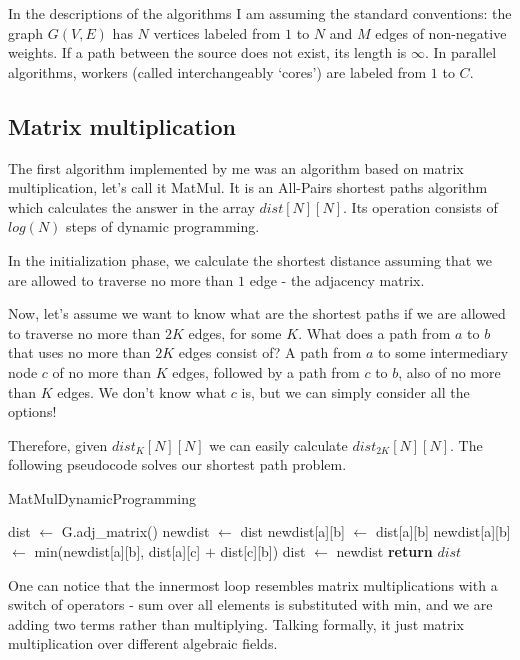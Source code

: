 \documentclass[12pt,a4paper,twoside,openright]{report}
\begin{document}
In the descriptions of the algorithms I am assuming the standard conventions: the graph $G(V,E)$ has $N$ vertices labeled from $1$ to $N$ and $M$ edges of non-negative weights. If a path between the source does not exist, its length is $\infty$. In parallel algorithms, workers (called interchangeably `cores') are labeled from $1$ to $C$.

\subsection{Matrix multiplication}
The first algorithm implemented by me was an algorithm based on matrix multiplication, let's call it MatMul. It is an All-Pairs shortest paths algorithm which calculates the answer in the array $dist[N][N]$. Its operation consists of $log(N)$ steps of dynamic programming.

In the initialization phase, we calculate the shortest distance assuming that we are allowed to traverse no more than $1$ edge - the adjacency matrix.

Now, let's assume we want to know what are the shortest paths if we are allowed to traverse no more than $2K$ edges, for some $K$. What does a path from $a$ to $b$ that uses no more than $2K$ edges consist of? A path from $a$ to some intermediary node $c$ of no more than $K$ edges, followed by a path from $c$ to $b$, also of no more than $K$ edges. We don't know what $c$ is, but we can simply consider all the options! 

Therefore, given $dist_{K}[N][N]$ we can easily calculate $dist_{2K}[N][N]$. The following pseudocode solves our shortest path problem.

\begin{algorithm}
\caption{MatMulDynamicProgramming}\label{matmuldp}
\begin{algorithmic}[1]
\State dist $\gets$ G.adj\_matrix()
\State newdist $\gets$ dist
            \State newdist[a][b] $\gets$ dist[a][b]
            \State newdist[a][b] $\gets$ min(newdist[a][b], dist[a][c] $+$ dist[c][b])
        \EndFor
        \EndFor
        \EndFor
        \State dist $\gets$ newdist
      \EndFor
\State \textbf{return} $dist$
\EndProcedure
\end{algorithmic}
\end{algorithm}

One can notice that the innermost loop resembles matrix multiplications with a switch of operators - sum over all elements is substituted with min, and we are adding two terms rather than multiplying. Talking formally, it just matrix multiplication over different algebraic fields. 
\end{document}
